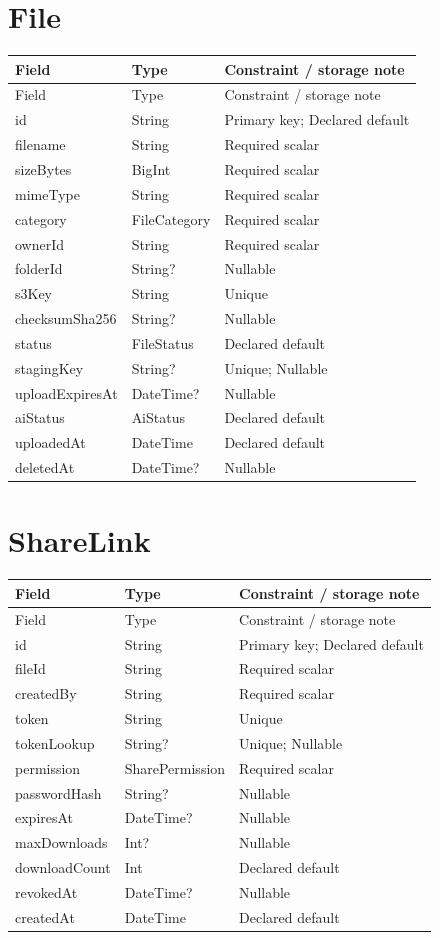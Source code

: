 \section{File}
\begin{longtable}{p{.31\linewidth}p{.23\linewidth}p{.36\linewidth}}\toprule Field&Type&Constraint / storage note\\\midrule\endfirsthead\toprule Field&Type&Constraint / storage note\\\midrule\endhead
id&String&Primary key; Declared default\\
filename&String&Required scalar\\
sizeBytes&BigInt&Required scalar\\
mimeType&String&Required scalar\\
category&FileCategory&Required scalar\\
ownerId&String&Required scalar\\
folderId&String?&Nullable\\
s3Key&String&Unique\\
checksumSha256&String?&Nullable\\
status&FileStatus&Declared default\\
stagingKey&String?&Unique; Nullable\\
uploadExpiresAt&DateTime?&Nullable\\
aiStatus&AiStatus&Declared default\\
uploadedAt&DateTime&Declared default\\
deletedAt&DateTime?&Nullable\\
\bottomrule\end{longtable}

\section{ShareLink}
\begin{longtable}{p{.31\linewidth}p{.23\linewidth}p{.36\linewidth}}\toprule Field&Type&Constraint / storage note\\\midrule\endfirsthead\toprule Field&Type&Constraint / storage note\\\midrule\endhead
id&String&Primary key; Declared default\\
fileId&String&Required scalar\\
createdBy&String&Required scalar\\
token&String&Unique\\
tokenLookup&String?&Unique; Nullable\\
permission&SharePermission&Required scalar\\
passwordHash&String?&Nullable\\
expiresAt&DateTime?&Nullable\\
maxDownloads&Int?&Nullable\\
downloadCount&Int&Declared default\\
revokedAt&DateTime?&Nullable\\
createdAt&DateTime&Declared default\\
\bottomrule\end{longtable}

